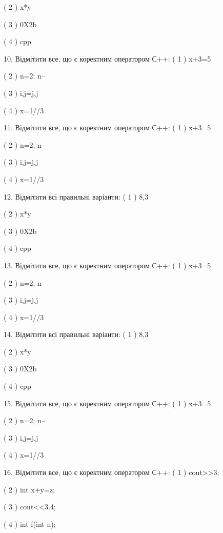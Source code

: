 \documentclass[11pt]{article}
\begin{document}
( 2 ) x*y

( 3 ) 0X2b

( 4 ) cpp

10. Відмітити все, що є коректним оператором С++:
( 1 ) x+3=5

( 2 ) n=2; n--

( 3 ) i,j=j,j

( 4 ) x=1//3

11. Відмітити все, що є коректним оператором С++:
( 1 ) x+3=5

( 2 ) n=2; n--

( 3 ) i,j=j,j

( 4 ) x=1//3

12. Відмітити всі правильні варіанти:
( 1 ) 8,3

( 2 ) x*y

( 3 ) 0X2b

( 4 ) cpp

13. Відмітити все, що є коректним оператором С++:
( 1 ) x+3=5

( 2 ) n=2; n--

( 3 ) i,j=j,j

( 4 ) x=1//3

14. Відмітити всі правильні варіанти:
( 1 ) 8,3

( 2 ) x*y

( 3 ) 0X2b

( 4 ) cpp

15. Відмітити все, що є коректним оператором С++:
( 1 ) x+3=5

( 2 ) n=2; n--

( 3 ) i,j=j,j

( 4 ) x=1//3

16. Відмітити все, що є коректним оператором С++:
( 1 ) cout>>3;

( 2 ) int x+y=z;

( 3 ) cout<<3.4;

( 4 ) int f(int n);

















\newpage
\end{document}
